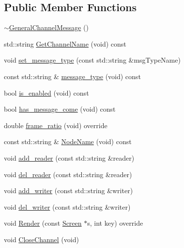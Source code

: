 \subsection*{Public Member Functions}
\begin{DoxyCompactItemize}
\item 
\hyperlink{classGeneralChannelMessage_a4b4051170a0227f18d3807b3da6290c8}{$\sim$\-General\-Channel\-Message} ()
\item 
std\-::string \hyperlink{classGeneralChannelMessage_acd67da9cdc84072627c42879469b2095}{Get\-Channel\-Name} (void) const 
\item 
void \hyperlink{classGeneralChannelMessage_ac8732e4bbf847a2218d78d57d0b9565b}{set\-\_\-message\-\_\-type} (const std\-::string \&msg\-Type\-Name)
\item 
const std\-::string \& \hyperlink{classGeneralChannelMessage_acffb0de01ee3fd896df64f7caed59ae3}{message\-\_\-type} (void) const 
\item 
bool \hyperlink{classGeneralChannelMessage_a112d3c8d26558666a5ee296c7e890699}{is\-\_\-enabled} (void) const 
\item 
bool \hyperlink{classGeneralChannelMessage_aa62162c570cfc990be7b5045406ea2ee}{has\-\_\-message\-\_\-come} (void) const 
\item 
double \hyperlink{classGeneralChannelMessage_ae607e8278605ccb88ea541965a2ff4bd}{frame\-\_\-ratio} (void) override
\item 
const std\-::string \& \hyperlink{classGeneralChannelMessage_a3df832daecc2a56b91c1a4165668a699}{Node\-Name} (void) const 
\item 
void \hyperlink{classGeneralChannelMessage_afa6acec81e88dbc16cfcb06651462da3}{add\-\_\-reader} (const std\-::string \&reader)
\item 
void \hyperlink{classGeneralChannelMessage_a54d35b4c1a5a2d042266fe7ef1591c42}{del\-\_\-reader} (const std\-::string \&reader)
\item 
void \hyperlink{classGeneralChannelMessage_aa9c664e67c018d7ddee6287a15972971}{add\-\_\-writer} (const std\-::string \&writer)
\item 
void \hyperlink{classGeneralChannelMessage_aedf08c4b88d2662a627f22b5a20c4ba9}{del\-\_\-writer} (const std\-::string \&writer)
\item 
void \hyperlink{classGeneralChannelMessage_af7f60b4c6e275dbfd0347aa2f8a2ac14}{Render} (const \hyperlink{classScreen}{Screen} $\ast$s, int key) override
\item 
void \hyperlink{classGeneralChannelMessage_a8ff914f416cc8684335a58b56f17c54d}{Close\-Channel} (void)
\end{DoxyCompactItemize}
